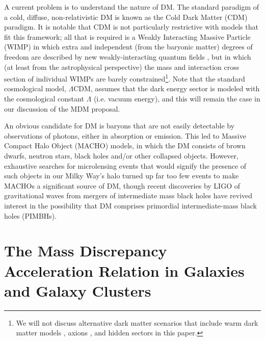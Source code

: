 \documentclass{bjp}
\begin{document}
A current problem is to understand the nature of DM. The standard paradigm of a cold, diffuse, non-relativistic DM is known as the Cold Dark Matter (CDM) paradigm\cite{Peebles:1982ff, Bond:1982uy, Blumenthal:1982mv, Blumenthal:1984bp}. It is notable that CDM is not particularly restrictive with models that fit this framework; all that is required is a Weakly Interacting Massive Particle (WIMP) in which extra and independent (from the baryonic matter) degrees of freedom are described by new weakly-interacting quantum fields \cite{Jungman:1995df}, but in which (at least from the astrophysical perspective) the mass and interaction cross section of individual WIMPs are barely constrained\footnote{We will not discuss alternative dark matter scenarios that include warm dark matter models \cite{Bode:2000gq}, axions \cite{Asztalos:2009yp}, and hidden sectors \cite{Strassler:2006im} in this paper.}. 
Note that the standard cosmological model, $\Lambda$CDM, assumes that the dark energy sector is modeled with the cosmological constant $\Lambda$ (i.e. vacuum energy), and this will remain the case in our discussion of the MDM proposal.

An obvious candidate for DM is baryons that are not easily detectable by observations of photons, either in absorption or emission. 
This led to Massive Compact Halo Object (MACHO) models, in which the DM consists of brown dwarfs, neutron stars, black holes and/or other collapsed objects. However, exhaustive searches for microlensing events that would signify the presence of such objects in our Milky Way's halo turned up far too few events to make MACHOs a significant source of DM\cite{alco96,alco97,Alcock:2000ph,calchi05,tisser07}, though recent discoveries by LIGO of gravitational waves from mergers of intermediate mass black holes\cite{Abbott:2016blz,Abbott:2016nmj} have revived interest in the possibility that DM comprises primordial intermediate-mass black holes (PIMBHs).



\section{The Mass Discrepancy Acceleration Relation in Galaxies and Galaxy Clusters}
\end{document}
